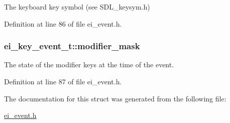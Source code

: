 The keyboard key symbol (see S\-D\-L\-\_\-keysym.\-h) 



Definition at line 86 of file ei\-\_\-event.\-h.

\hypertarget{structei__key__event__t_a35e4dc6d788b9fdd4eeedf716662afab}{
\subsubsection[{modifier\-\_\-mask}]{ ei\-\_\-key\-\_\-event\-\_\-t\-::modifier\-\_\-mask}}\label{structei__key__event__t_a35e4dc6d788b9fdd4eeedf716662afab}


The state of the modifier keys at the time of the event. 



Definition at line 87 of file ei\-\_\-event.\-h.



The documentation for this struct was generated from the following file\-:\begin{DoxyCompactItemize}
\item 
\hyperlink{ei__event_8h}{ei\-\_\-event.\-h}\end{DoxyCompactItemize}
